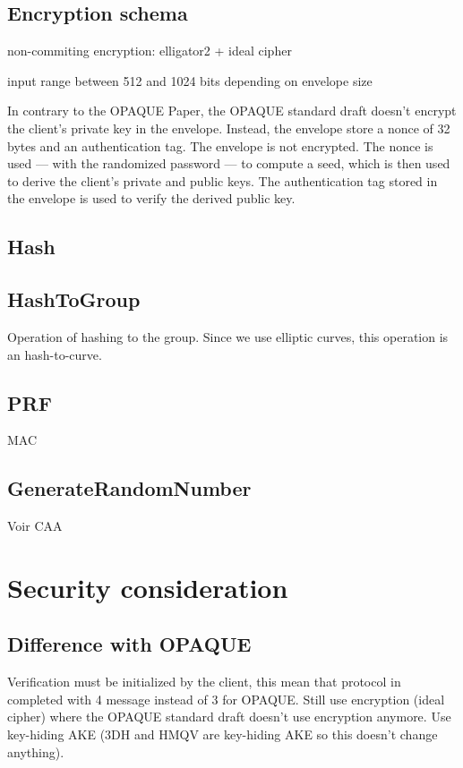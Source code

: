\documentclass[../report.tex]{subfiles}
\begin{document}
\subsection{Encryption schema}
non-commiting encryption: elligator2 + ideal cipher

input range between 512 and 1024 bits depending on envelope size


In contrary to the OPAQUE Paper, the OPAQUE standard draft doesn't encrypt the client's private key in the envelope.
Instead, the envelope store a nonce of 32 bytes and an authentication tag. The envelope is not encrypted.
The nonce is used --- with the randomized password --- to compute a seed, which is then used to derive the client's private and public keys. The authentication tag stored in the envelope is used to verify the derived public key.


\subsection{Hash}

\subsection{HashToGroup}
Operation of hashing to the group. Since we use elliptic curves, this operation is an hash-to-curve.


\subsection{PRF}
MAC

\subsection{GenerateRandomNumber}
Voir CAA





\section{Security consideration}

\subsection{Difference with OPAQUE} %

Verification must be initialized by the client, this mean that protocol in completed with 4 message instead of 3 for OPAQUE.
Still use encryption (ideal cipher) where the OPAQUE standard draft doesn't use encryption anymore.
Use key-hiding AKE (3DH and HMQV are key-hiding AKE so this doesn't change anything).
\end{document}
